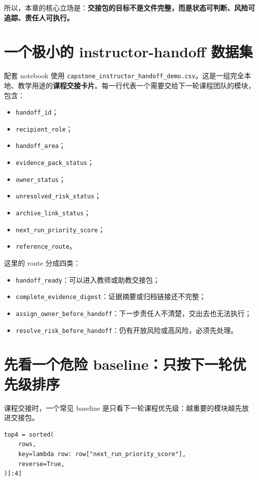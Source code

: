 所以，本章的核心立场是：\textbf{交接包的目标不是文件完整，而是状态可判断、风险可追踪、责任人可执行。}

\section{一个极小的 instructor-handoff 数据集}

配套 notebook 使用 \nolinkurl{capstone_instructor_handoff_demo.csv}。这是一组完全本地、教学用途的\textbf{课程交接卡片}。每一行代表一个需要交给下一轮课程团队的模块，包含：

\begin{itemize}
    \item \texttt{handoff\_id}；
    \item \texttt{recipient\_role}；
    \item \texttt{handoff\_area}；
    \item \texttt{evidence\_pack\_status}；
    \item \texttt{owner\_status}；
    \item \texttt{unresolved\_risk\_status}；
    \item \texttt{archive\_link\_status}；
    \item \texttt{next\_run\_priority\_score}；
    \item \texttt{reference\_route}。
\end{itemize}

这里的 route 分成四类：

\begin{itemize}
    \item \texttt{handoff\_ready}：可以进入教师或助教交接包；
    \item \texttt{complete\_evidence\_digest}：证据摘要或归档链接还不完整；
    \item \texttt{assign\_owner\_before\_handoff}：下一步责任人不清楚，交出去也无法执行；
    \item \texttt{resolve\_risk\_before\_handoff}：仍有开放风险或高风险，必须先处理。
\end{itemize}

\section{先看一个危险 baseline：只按下一轮优先级排序}

课程交接时，一个常见 baseline 是只看下一轮课程优先级：越重要的模块越先放进交接包。

\begin{examplebox}
\begin{lstlisting}[style=pythonstyle]
top4 = sorted(
    rows,
    key=lambda row: row["next_run_priority_score"],
    reverse=True,
)[:4]
\end{lstlisting}
\end{examplebox}

